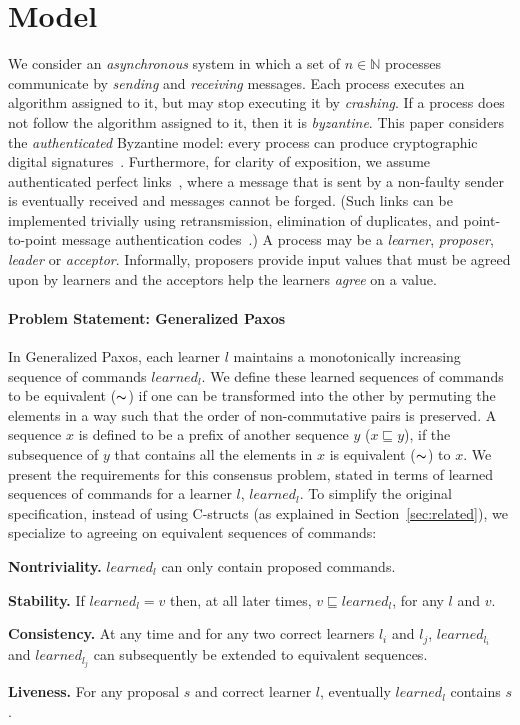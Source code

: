 \section{Model}
\label{sec:model}
%
We consider an \emph{asynchronous} system in which
a set of $n \in \mathbb{N}$ processes communicate by 
\emph{sending} and \emph{receiving} messages.
Each process executes an algorithm assigned to it, but may stop executing it by \emph{crashing}.
If a process does not follow the algorithm assigned to it, then it is \emph{byzantine}.
This paper considers the \emph{authenticated} Byzantine model: every process can produce cryptographic digital signatures~\cite{quorum}. Furthermore, for clarity of exposition, we assume authenticated perfect links~\cite{cgr:book}, where a message that is sent by a non-faulty sender is eventually received and messages cannot be forged. (Such links can be implemented trivially using retransmission, elimination of duplicates, and point-to-point message authentication codes~\cite{cgr:book}.)
A process may be a \emph{learner}, \emph{proposer}, \emph{leader} or \emph{acceptor}.
Informally, proposers provide input values that must be agreed upon by learners and the acceptors help the learners \emph{agree} on a value.

\paragraph{Problem Statement: Generalized Paxos}
In Generalized Paxos, each learner $l$ maintains a monotonically increasing sequence of commands $learned_l$. 
We define these learned sequences of commands to be equivalent ($\thicksim$) 
if one can be transformed into the other by permuting the elements in a way such that the order of non-commutative pairs is preserved. A sequence $x$ is defined to be a prefix of another sequence $y$ ($x \sqsubseteq y$), if the subsequence of $y$ that contains all the elements in $x$ is equivalent ($\thicksim$) to $x$. 
We present the requirements for this consensus problem, stated in terms of learned sequences of commands for a learner $l$, $learned_l$. To simplify the original specification, instead of using C-structs (as explained in Section~\ref{sec:related}), we specialize to agreeing on equivalent sequences of commands:\par
\textbf{Nontriviality.} $learned_l$ can only contain proposed commands. \par
\textbf{Stability.} If $learned_l = v$ then, at all later times, $v \sqsubseteq learned_l$, for any $l$ and $v$. \par
\textbf{Consistency.} At any time and for any two correct learners $l_i$ and $l_j$, $learned_{l_i}$ and $learned_{l_j}$ can subsequently be extended to equivalent sequences.\par
\textbf{Liveness.} For any proposal $s$ and correct learner $l$, eventually $learned_l$ contains $s$.\par
